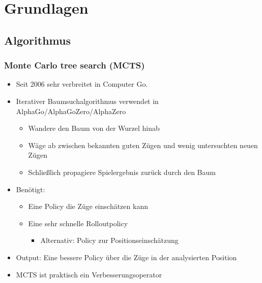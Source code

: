 \section{Grundlagen}




\subsection{Algorithmus}



\begin{frame}
 \frametitle{Monte Carlo tree search (MCTS)}
  


\begin{itemize}
  \item \pause Seit 2006 sehr verbreitet in Computer Go.
  \item \pause Iterativer Baumsuchalgorithmus verwendet in AlphaGo/AlphaGoZero/AlphaZero
\begin{itemize}
  \item \pause Wandere den Baum von der Wurzel hinab
  \item \pause Wäge ab zwischen bekannten guten Zügen und wenig untersuchten neuen Zügen
  \item \pause Schließlich propagiere Spielergebnis zurück durch den Baum
\end{itemize}
  \item \pause Benötigt:
\begin{itemize}
  \item \pause Eine Policy die Züge einschätzen kann
  \item \pause Eine sehr schnelle Rolloutpolicy
\begin{itemize}
  \item \pause Alternativ: Policy zur Positionseinschätzung
\end{itemize}
\end{itemize}
  \item \pause Output: Eine bessere Policy über die Züge in der analysierten Position
  \item \pause MCTS ist praktisch ein Verbesserungsoperator
\end{itemize}

  
\end{frame}
